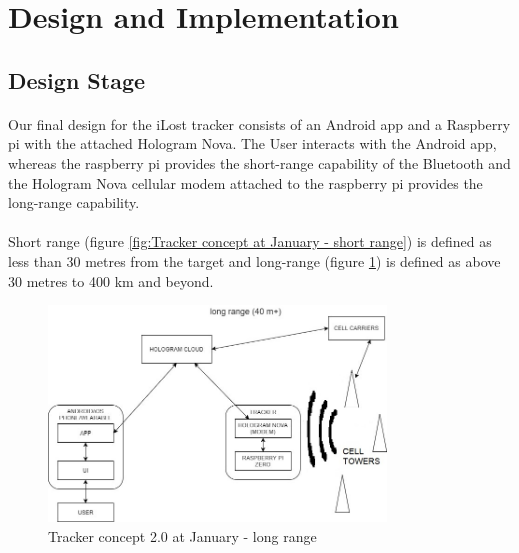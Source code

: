 \documentclass[12pt,a4paper]{article}
\begin{document}
    \section{Design and Implementation}
      \subsection{Design Stage}
        \paragraph{} Our final design for the iLost tracker consists of an Android app and a Raspberry pi with the attached Hologram Nova. The User interacts with the Android app, whereas the raspberry pi provides the short-range capability of the Bluetooth and the Hologram Nova cellular modem attached to the raspberry pi provides the long-range capability.

        \paragraph{} Short range (figure \ref{fig:Tracker concept at January - short range}) is defined as less than 30 metres from the target and long-range (figure \ref{fig:Tracker concept at January - long range}) is defined as above 30 metres to 400 km and beyond.
        
        \begin{figure}[H]
          \centering
          \includegraphics[width=0.8\textwidth]{../assets/design-concept-v20-long-range.jpg}
          \caption{Tracker concept 2.0 at January - long range}
          \label{fig:Tracker concept at January - long range}
        \end{figure}
        
\end{document}
